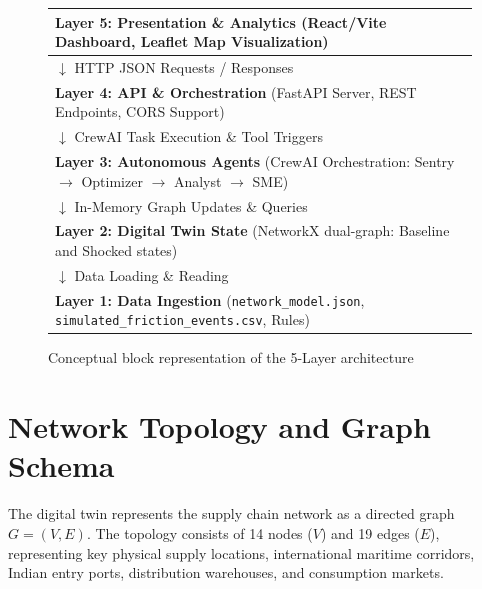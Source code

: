 \begin{figure}[htb]
\centering
\begin{tabular}{|p{12cm}|}
\hline
\textbf{Layer 5: Presentation \& Analytics} (React/Vite Dashboard, Leaflet Map Visualization) \\
\hline
\centering$\downarrow$ HTTP JSON Requests / Responses \\
\hline
\textbf{Layer 4: API \& Orchestration} (FastAPI Server, REST Endpoints, CORS Support) \\
\hline
\centering$\downarrow$ CrewAI Task Execution \& Tool Triggers \\
\hline
\textbf{Layer 3: Autonomous Agents} (CrewAI Orchestration: Sentry $\to$ Optimizer $\to$ Analyst $\to$ SME) \\
\hline
\centering$\downarrow$ In-Memory Graph Updates \& Queries \\
\hline
\textbf{Layer 2: Digital Twin State} (NetworkX dual-graph: Baseline and Shocked states) \\
\hline
\centering$\downarrow$ Data Loading \& Reading \\
\hline
\textbf{Layer 1: Data Ingestion} (\texttt{network\_model.json}, \texttt{simulated\_friction\_events.csv}, Rules) \\
\hline
\end{tabular}
\caption{Conceptual block representation of the 5-Layer architecture}
\label{c3:fig_arch}
\end{figure}

\section{Network Topology and Graph Schema}
The digital twin represents the supply chain network as a directed graph $G = (V, E)$. The topology consists of 14 nodes ($V$) and 19 edges ($E$), representing key physical supply locations, international maritime corridors, Indian entry ports, distribution warehouses, and consumption markets.

